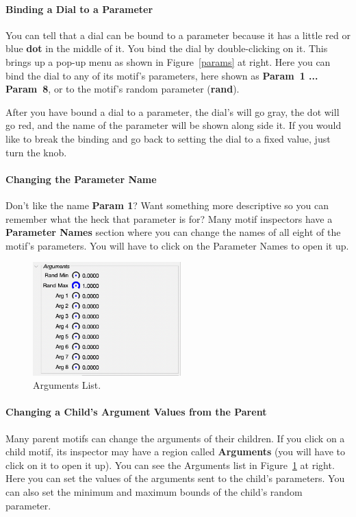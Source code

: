 \documentclass[twoside,10pt]{article}
\begin{document}
\paragraph{Binding a Dial to a Parameter} You can tell that a dial can be bound to a parameter because it has a little red or blue {\bf dot} in the middle of it.  You bind the dial by double-clicking on it.  This brings up a pop-up menu as shown in Figure~\ref{params} at right.  Here you can bind the dial to any of its motif's parameters, here shown as {\bf Param~1 ... Param~8}, or to the motif's random parameter ({\bf rand}).

After you have bound a dial to a parameter, the dial's will go gray, the dot will go red, and the name of the parameter will be shown along side it. If you would like to break the binding and go back to setting the dial to a fixed value, just turn the knob. 

\paragraph{Changing the Parameter Name} Don't like the name {\bf Param 1}?  Want something more descriptive so you can remember what the heck that parameter is for?  Many motif inspectors have a {\bf Parameter Names} section where you can change the names of all eight of the motif's parameters.  You will have to click on the Parameter Names to open it up.

\begin{figure}
\includegraphics[width=2.25in]{arguments}
\caption{Arguments List.}
\label{arguments}
\end{figure}

\paragraph{Changing a Child's Argument Values from the Parent} Many parent motifs can change the arguments of their children.  If you click on a child motif, its inspector may have a region called {\bf Arguments} (you will have to click on it to open it up).  You can see the Arguments list in Figure~\ref{arguments} at right.  Here you can set the values of the arguments sent to the child's parameters.  You can also set the minimum and maximum bounds of the child's random parameter.   
\end{document}
